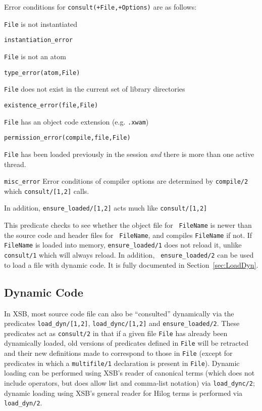 \begin{description}
Error conditions for {\tt consult(+File,+Options)} are as follows: 
\bi
\item 	{\tt File} is not instantiated
\bi
\item 	{\tt instantiation\_error}
\ei
%
\item 	{\tt File} is not an atom
\bi
\item 	{\tt type\_error(atom,File)}
\ei
\item 	{\tt File} does not exist in the current set of library directories
\bi
\item 	{\tt existence\_error(file,File)}
\ei
%
\item 	{\tt File} has an object code extension (e.g. {\tt .xwam})
\bi
\item 	{\tt permission\_error(compile,file,File)}
\ei
%
\item {\tt File} has been loaded previously in the session {\em and}
  there is more than one active thread.  \bi
\item 	{\tt misc\_error}
\ei
\ei
Error conditions of compiler options are determined by {\tt compile/2}
which {\tt consult/[1,2]} calls.
\end{description}

In addition, {\tt ensure\_loaded/[1,2]} acts much like {\tt consult/[1,2]}
\begin{description}
%
This predicate checks to see whether the object file for {\tt
FileName} is newer than the source code and header files for {\tt
FileName}, and compiles {\tt FileName} if not.  If {\tt FileName} is
loaded into memory, {\tt ensure\_loaded/1} does not reload it, unlike
{\tt consult/1} which will always reload.  In addition, {\tt
  ensure\_loaded/2} can be used to load a file with dynamic code.  It
is fully documented in Section~\ref{sec:LoadDyn}.
\end{description}
% 

\subsection{Dynamic Code}
% 
In XSB, most source code file can also be ``consulted'' dynamically
via the predicates {\tt load\_dyn/[1,2]}, {\tt load\_dync/[1,2]} and
{\tt ensure\_loaded/2}.  These predicates act as {\tt consult/2} in
that if a given file {\tt File} has already been dynamically loaded,
old versions of predicates defined in {\tt File} will be retracted and
their new definitions made to correspond to those in {\tt File}
(except for predicates in which a {\tt multifile/1} declaration is
present in {\tt File}).  Dynamic loading can be performed using XSB's
reader of canonical terms (which does not include operators, but does
allow list and comma-list notation) via {\tt load\_dync/2}; dynamic
loading using XSB's general reader for Hilog terms is performed via
{\tt load\_dyn/2}.  

